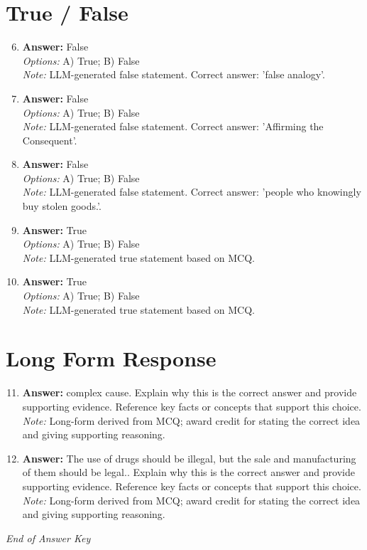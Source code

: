 \documentclass[12pt]{article}
\begin{document}
\section*{True / False}
\begin{enumerate}[label=\arabic*.]
\setcounter{enumi}{5}
\item \textbf{Answer:} False
\\ \textit{Options:} A) True; B) False
\\ \textit{Note:} LLM-generated false statement. Correct answer: 'false analogy'.
\item \textbf{Answer:} False
\\ \textit{Options:} A) True; B) False
\\ \textit{Note:} LLM-generated false statement. Correct answer: 'Affirming the Consequent'.
\item \textbf{Answer:} False
\\ \textit{Options:} A) True; B) False
\\ \textit{Note:} LLM-generated false statement. Correct answer: 'people who knowingly buy stolen goods.'.
\item \textbf{Answer:} True
\\ \textit{Options:} A) True; B) False
\\ \textit{Note:} LLM-generated true statement based on MCQ.
\item \textbf{Answer:} True
\\ \textit{Options:} A) True; B) False
\\ \textit{Note:} LLM-generated true statement based on MCQ.
\end{enumerate}

\section*{Long Form Response}
\begin{enumerate}[label=\arabic*.]
\setcounter{enumi}{10}
\item \textbf{Answer:} complex cause. Explain why this is the correct answer and provide supporting evidence. Reference key facts or concepts that support this choice.
\\ \textit{Note:} Long-form derived from MCQ; award credit for stating the correct idea and giving supporting reasoning.
\item \textbf{Answer:} The use of drugs should be illegal, but the sale and manufacturing of them should be legal.. Explain why this is the correct answer and provide supporting evidence. Reference key facts or concepts that support this choice.
\\ \textit{Note:} Long-form derived from MCQ; award credit for stating the correct idea and giving supporting reasoning.
\end{enumerate}

\vfill
\noindent\textit{End of Answer Key}
\end{document}
